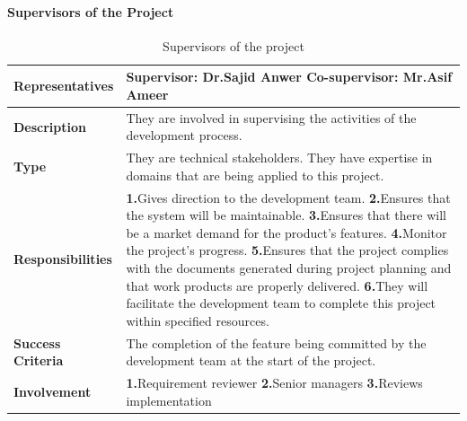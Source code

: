 \documentclass[12pt,a4paper]{article}
\begin{document}
\paragraph{Supervisors of the Project}%
\begin{table}[ht]
\caption{Supervisors of the project}
    \centering
    \begin{tabular}{|l|p{7cm}|}
    \hline
       \textbf{Representatives}  &\textbf{Supervisor:}
       Dr.Sajid Anwer
\newline \textbf{Co-supervisor:}  Mr.Asif Ameer   \\%
       \hline
         \textbf{Description}&They are involved in supervising the activities of the development process. \\%
         \hline
         \textbf{Type}&They are technical stakeholders. They have expertise in domains that are being applied to this project.\\%
         \hline
         \textbf{Responsibilities}&
        \textbf{1.}Gives direction to the development team. 
    \newline\textbf{2.}Ensures that the system will be maintainable. 
    \newline\textbf{3.}Ensures that there will be a market demand for the product’s features. 
    \newline\textbf{4.}Monitor the project’s progress. 
    \newline\textbf{5.}Ensures that the project complies with the documents generated during project planning and that work products are properly delivered. 
    \newline\textbf{6.}They will facilitate the development team to complete this project within specified resources.\\%
    \hline
         \textbf{Success Criteria }&The completion of the feature being committed by the development team at the start of the project. \\%
         \hline
         \textbf{Involvement}&
         \newline\textbf{1.}Requirement reviewer 
         \newline\textbf{2.}Senior managers 
         \newline\textbf{3.}Reviews implementation  \\%
         \hline
    \end{tabular}
\end{table}
\vfill
\newpage
\end{document}
